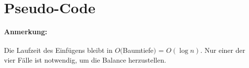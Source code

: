 \pagebreak


\section{Pseudo-Code}


\paragraph{Anmerkung:} Die Laufzeit des Einfügens bleibt in $O($Baumtiefe$)$ = $O(\log{n})$. Nur einer der vier Fälle ist notwendig, um die Balance herzustellen. 
\pagebreak